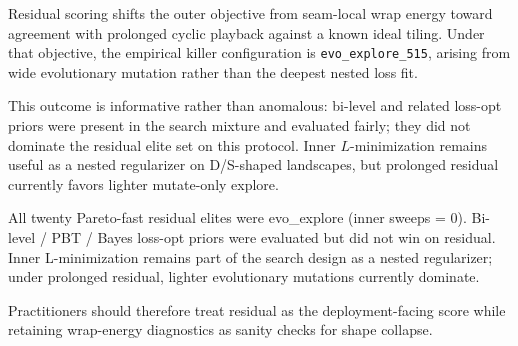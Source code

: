 Residual scoring shifts the outer objective from seam-local wrap energy toward agreement with prolonged cyclic playback against a known ideal tiling. Under that objective, the empirical killer configuration is \texttt{evo\_explore\_515}, arising from wide evolutionary mutation rather than the deepest nested loss fit.

This outcome is informative rather than anomalous: bi-level and related loss-opt priors were present in the search mixture and evaluated fairly; they did not dominate the residual elite set on this protocol. Inner $L$-minimization remains useful as a nested regularizer on D/S-shaped landscapes, but prolonged residual currently favors lighter mutate-only explore.

All twenty Pareto-fast residual elites were evo\_explore (inner sweeps = 0). Bi-level / PBT / Bayes loss-opt priors were evaluated but did not win on residual. Inner L-minimization remains part of the search design as a nested regularizer; under prolonged residual, lighter evolutionary mutations currently dominate.

Practitioners should therefore treat residual as the deployment-facing score while retaining wrap-energy diagnostics as sanity checks for shape collapse.
